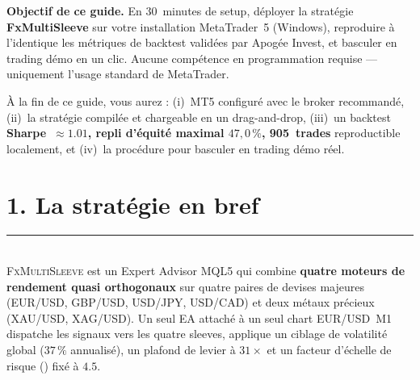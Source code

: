 \documentclass[11pt, a4paper]{scrartcl}
\begin{document}
\vspace{0.8cm}

\begin{thesisbox}
\textbf{Objectif de ce guide.} En 30~minutes de setup, déployer la stratégie
\textbf{FxMultiSleeve} sur votre installation MetaTrader~5 (Windows), reproduire à
l'identique les métriques de backtest validées par Apogée Invest, et basculer en
trading démo en un clic. Aucune compétence en programmation requise --- uniquement
l'usage standard de MetaTrader.
\end{thesisbox}

\vspace{0.4cm}

{\small\color{slateGrey}\sffamily
À la fin de ce guide, vous aurez : (i)~MT5 configuré avec le broker recommandé,
(ii)~la stratégie compilée et chargeable en un drag-and-drop, (iii)~un backtest
\textbf{Sharpe~$\approx 1.01$, repli d'équité maximal
$47{,}0\,\%$, 905~trades} reproductible localement, et (iv)~la procédure pour basculer en trading démo réel.}

\vfill

\noindent\colorbox{lightGrey}{%
}

\vspace{0.3cm}

\noindent{\color{apogeeGold}\rule{\textwidth}{2pt}}

\clearpage

\section*{1. La stratégie en bref}
\vspace{-0.4em}
{\color{accent}\rule{\linewidth}{1.0pt}}\\[0.4em]

\lettrine[lines=2, findent=2pt, nindent=0pt]{F}{xMultiSleeve} est un Expert
Advisor MQL5 qui combine \textbf{quatre moteurs de rendement quasi orthogonaux}
sur quatre paires de devises majeures (EUR/USD, GBP/USD, USD/JPY, USD/CAD) et deux
métaux précieux (XAU/USD, XAG/USD). Un seul EA attaché à un seul chart EUR/USD~M1
dispatche les signaux vers
les quatre sleeves, applique un ciblage de volatilité global ($37\,\%$ annualisé),
un plafond de levier à $31\times$ et un facteur d'échelle de risque
() fixé à $4.5$.
\end{document}
